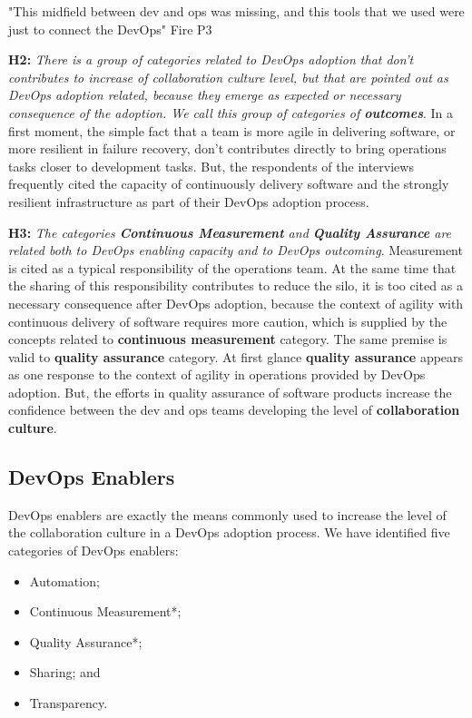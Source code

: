 "This midfield between dev and ops was missing, and this tools that we used were just to connect the DevOps" Fire P3

\textbf{H2:} \textit{There is a group of categories related to DevOps adoption that don't contributes to increase of collaboration culture level, but that are pointed out as DevOps adoption related, because they emerge as expected or necessary consequence of the adoption. We call this group of categories of \textbf{outcomes}}. In a first moment, the simple fact that a team is more agile in delivering software, or more resilient in failure recovery, don't contributes directly to bring operations tasks closer to development tasks. But, the respondents of the interviews frequently cited the capacity of continuously delivery software and the strongly resilient infrastructure as part of their DevOps adoption process.

\textbf{H3:} \textit{The categories \textbf{Continuous Measurement} and \textbf{Quality Assurance} are related both to DevOps enabling capacity and to DevOps outcoming}. Measurement is cited as a typical responsibility of the operations team. At the same time that the sharing of this responsibility contributes to reduce the silo, it is too cited as a necessary consequence after DevOps adoption, because the context of agility with continuous delivery of software requires more caution, which is supplied by the concepts related to \textbf{continuous measurement} category. The same premise is valid to \textbf{quality assurance} category. At first glance \textbf{quality assurance} appears as one response to the context of agility in operations provided by DevOps adoption. But, the efforts in quality assurance of software products increase the confidence between the dev and ops teams developing the level of \textbf{collaboration culture}.

\subsection{DevOps Enablers}

DevOps enablers are exactly the means commonly used to increase the level of the collaboration culture in a DevOps adoption process. We have identified five categories of DevOps enablers:

\begin{itemize}
\item Automation;
\item Continuous Measurement*;
\item Quality Assurance*;
\item Sharing; and
\item Transparency.
\end{itemize}

